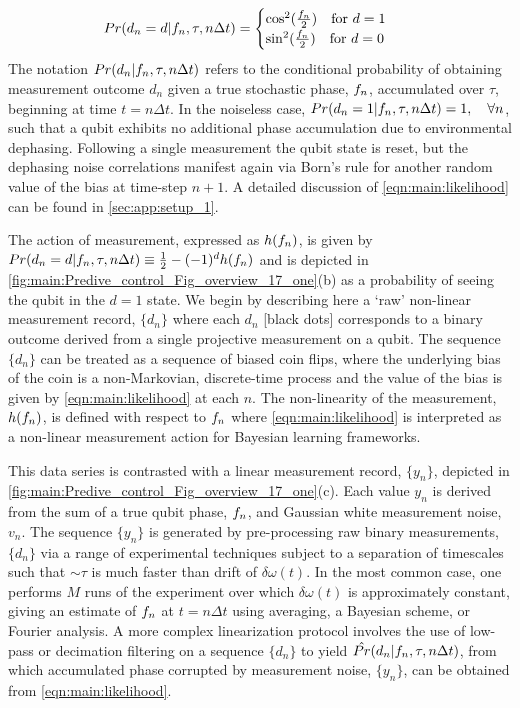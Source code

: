 \begin{align}
	Pr(d_n=d | f_n, \tau, n \Delta t) &= \begin{cases} \cos^2(\frac{f_{n}}{2}) \quad \text{for $d=1$} \\   \sin^2(\frac{f_{n}}{2})  \quad \text{for $ d=0$}  \end{cases} \label{eqn:main:likelihood} 
\end{align}
The notation $Pr(d_n | f_n, \tau, n \Delta t)$ refers to the conditional probability of obtaining measurement outcome $d_n$ given a true stochastic phase, $f_n$, accumulated over $\tau$, beginning at time $t = n \Delta t$. In the noiseless case, $Pr(d_n=1|f_n, \tau, n \Delta t) = 1, \quad \forall n $, such that a qubit exhibits no additional phase accumulation due to environmental dephasing. Following a single measurement the qubit state is reset, but the dephasing noise correlations manifest again via Born's rule for another random value of the bias at time-step $n+1$. A detailed discussion of \cref{eqn:main:likelihood} can be found in \cref{sec:app:setup_1}.

The action of measurement, expressed as $h(f_n)$, is given by $Pr(d_n=d| f_n, \tau, n \Delta t) \equiv \frac{1}{2} - (-1)^d h(f_n) $ and is depicted in \cref{fig:main:Predive_control_Fig_overview_17_one}(b) as a probability of seeing the qubit in the $d=1$ state.  We begin by describing here a `raw' non-linear measurement record, $\{ d_n\}$ where each $d_n$ [black dots] corresponds to a binary outcome derived from a single projective measurement on a qubit. The sequence $\{ d_n\}$ can be treated as a sequence of biased coin flips, where the underlying bias of the coin is a non-Markovian, discrete-time process and the value of the bias is given by \cref{eqn:main:likelihood} at each $n$. The non-linearity of the measurement, $h(f_n)$, is defined with respect to $f_n$ where \cref{eqn:main:likelihood} is interpreted as a non-linear measurement action for Bayesian learning frameworks.

This data series is contrasted with a linear measurement record, $\{ y_n\}$, depicted in \cref{fig:main:Predive_control_Fig_overview_17_one}(c).  Each value $y_n$ is derived from the sum of a true qubit phase, $f_n$, and Gaussian white measurement noise, $v_n$.  The sequence $\{ y_n\}$ is generated by pre-processing raw binary measurements, $\{ d_n\}$ via a range of experimental techniques subject to a separation of timescales such that $\sim\tau$ is much faster than drift of $\delta \omega (t)$.  In the most common case, one performs $M$ runs of the experiment over which $\delta \omega (t)$ is approximately constant, giving an estimate of  $f_n$ at $t = n \Delta t $ using averaging, a Bayesian scheme, or Fourier analysis. A more complex linearization protocol involves the use of low-pass or decimation filtering on a sequence $\{ d_n\}$  to yield $\hat{Pr}(d_n | f_n, \tau, n\Delta t)$, from which accumulated phase corrupted by measurement noise, $\{ y_n\}$, can be obtained from \cref{eqn:main:likelihood}. 

